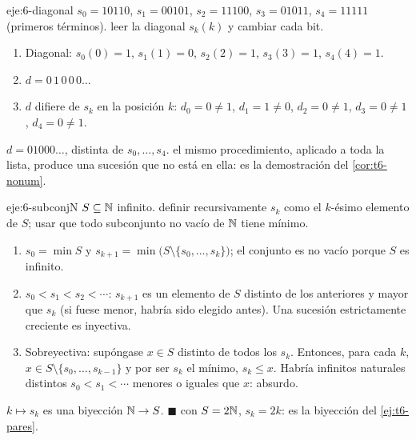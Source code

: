 \begin{solucion}{eje:6-diagonal}
\datos $s_0=10110$, $s_1=00101$, $s_2=11100$, $s_3=01011$, $s_4=11111$ (primeros términos).
\planteamiento leer la diagonal $s_k(k)$ y cambiar cada bit.
\pasos
\begin{enumerate}[label=\arabic*.]
  \item Diagonal: $s_0(0)=1$, $s_1(1)=0$, $s_2(2)=1$, $s_3(3)=1$, $s_4(4)=1$.
  \item $d=0\,1\,0\,0\,0\ldots$
  \item $d$ difiere de $s_k$ en la posición $k$: $d_0=0\neq1$, $d_1=1\neq0$, $d_2=0\neq1$, $d_3=0\neq1$, $d_4=0\neq1$.
\end{enumerate}
\resultado $d=01000\ldots$, distinta de $s_0,\dots,s_4$.
\comprobacion el mismo procedimiento, aplicado a toda la lista, produce una sucesión que no está en ella: es la demostración del \cref{cor:t6-nonum}.
\end{solucion}

\begin{solucion}{eje:6-subconjN}
\datos $S\subseteq\mathbb{N}$ infinito.
\planteamiento definir recursivamente $s_k$ como el $k$-ésimo elemento de $S$; usar que todo subconjunto no vacío de $\mathbb{N}$ tiene mínimo.
\pasos
\begin{enumerate}[label=\arabic*.]
  \item $s_0=\min S$ y $s_{k+1}=\min\bigl(S\setminus\{s_0,\dots,s_k\}\bigr)$; el conjunto es no vacío porque $S$ es infinito.
  \item $s_0<s_1<s_2<\cdots$: $s_{k+1}$ es un elemento de $S$ distinto de los anteriores y mayor que $s_k$ (si fuese menor, habría sido elegido antes). Una sucesión estrictamente creciente es inyectiva.
  \item Sobreyectiva: supóngase $x\in S$ distinto de todos los $s_k$. Entonces, para cada $k$, $x\in S\setminus\{s_0,\dots,s_{k-1}\}$ y por ser $s_k$ el mínimo, $s_k\le x$. Habría infinitos naturales distintos $s_0<s_1<\cdots$ menores o iguales que $x$: absurdo.
\end{enumerate}
\resultado $k\mapsto s_k$ es una biyección $\mathbb{N}\to S$. \hfill$\blacksquare$
\comprobacion con $S=2\mathbb{N}$, $s_k=2k$: es la biyección del \cref{ej:t6-pares}.
\end{solucion}

